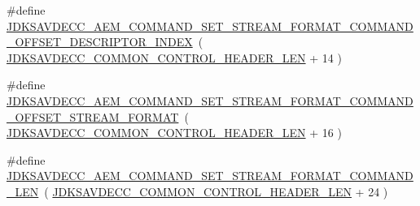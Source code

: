 \begin{DoxyCompactItemize}
\item 
\#define \hyperlink{group__command__set__stream__format_ga19cb37fc561c782663dd8848f8ae1afa}{J\+D\+K\+S\+A\+V\+D\+E\+C\+C\+\_\+\+A\+E\+M\+\_\+\+C\+O\+M\+M\+A\+N\+D\+\_\+\+S\+E\+T\+\_\+\+S\+T\+R\+E\+A\+M\+\_\+\+F\+O\+R\+M\+A\+T\+\_\+\+C\+O\+M\+M\+A\+N\+D\+\_\+\+O\+F\+F\+S\+E\+T\+\_\+\+D\+E\+S\+C\+R\+I\+P\+T\+O\+R\+\_\+\+I\+N\+D\+EX}~( \hyperlink{group__jdksavdecc__avtp__common__control__header_gaae84052886fb1bb42f3bc5f85b741dff}{J\+D\+K\+S\+A\+V\+D\+E\+C\+C\+\_\+\+C\+O\+M\+M\+O\+N\+\_\+\+C\+O\+N\+T\+R\+O\+L\+\_\+\+H\+E\+A\+D\+E\+R\+\_\+\+L\+EN} + 14 )
\item 
\#define \hyperlink{group__command__set__stream__format_ga47e12fafe288a15811b8aeec4cbe96b2}{J\+D\+K\+S\+A\+V\+D\+E\+C\+C\+\_\+\+A\+E\+M\+\_\+\+C\+O\+M\+M\+A\+N\+D\+\_\+\+S\+E\+T\+\_\+\+S\+T\+R\+E\+A\+M\+\_\+\+F\+O\+R\+M\+A\+T\+\_\+\+C\+O\+M\+M\+A\+N\+D\+\_\+\+O\+F\+F\+S\+E\+T\+\_\+\+S\+T\+R\+E\+A\+M\+\_\+\+F\+O\+R\+M\+AT}~( \hyperlink{group__jdksavdecc__avtp__common__control__header_gaae84052886fb1bb42f3bc5f85b741dff}{J\+D\+K\+S\+A\+V\+D\+E\+C\+C\+\_\+\+C\+O\+M\+M\+O\+N\+\_\+\+C\+O\+N\+T\+R\+O\+L\+\_\+\+H\+E\+A\+D\+E\+R\+\_\+\+L\+EN} + 16 )
\item 
\#define \hyperlink{group__command__set__stream__format_ga54f70043611f17ce7ca3c27c68a02fa6}{J\+D\+K\+S\+A\+V\+D\+E\+C\+C\+\_\+\+A\+E\+M\+\_\+\+C\+O\+M\+M\+A\+N\+D\+\_\+\+S\+E\+T\+\_\+\+S\+T\+R\+E\+A\+M\+\_\+\+F\+O\+R\+M\+A\+T\+\_\+\+C\+O\+M\+M\+A\+N\+D\+\_\+\+L\+EN}~( \hyperlink{group__jdksavdecc__avtp__common__control__header_gaae84052886fb1bb42f3bc5f85b741dff}{J\+D\+K\+S\+A\+V\+D\+E\+C\+C\+\_\+\+C\+O\+M\+M\+O\+N\+\_\+\+C\+O\+N\+T\+R\+O\+L\+\_\+\+H\+E\+A\+D\+E\+R\+\_\+\+L\+EN} + 24 )
\end{DoxyCompactItemize}
